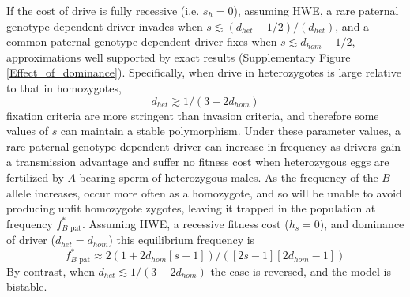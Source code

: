 \documentclass[12pt,letterpaper]{article}
\begin{document}
If the cost of drive is fully recessive (i.e. $s_h=0$), assuming HWE, 
	a rare paternal genotype dependent driver invades when 
	$s\lesssim (d_{het}-1/2)/(d_{het})$, and a common paternal genotype dependent driver fixes when 
	$s\lesssim d_{hom}-1/2$, approximations well supported by exact results (Supplementary Figure \ref{Effect_of_dominance}).
Specifically, when drive in heterozygotes is large relative to that in homozygotes, 
	\begin{equation} d_{het} \gtrsim 1/(3-2d_{hom}) \label{polymale} \end{equation}
	fixation criteria are more stringent than invasion criteria, 
	and therefore some values of $s$ can maintain a stable polymorphism. 
Under these parameter values, a rare paternal genotype dependent driver 
	can increase in frequency as drivers gain a transmission advantage and suffer 
	no fitness cost when heterozygous eggs are fertilized by 
	$A$-bearing sperm of heterozygous males. 
As the frequency of the $B$ allele increases, 
	occur more often as a homozygote, and so will be unable to 
	avoid producing unfit homozygote zygotes, leaving it trapped in
	the population at frequency $f_{B\text{ pat}}^*$. 
Assuming HWE, a recessive fitness cost ($h_s=0$), and dominance of driver ($d_{het}=d_{hom}$) this equilibrium frequency is
\begin{equation}f_{B\text{ pat}}^*\approx2 (1 + 2d_{hom}[s - 1])/([2 s - 1][2d_{hom}- 1]) \label{eqmale} \end{equation}
By contrast, when $d_{het} \lesssim 1/(3-2d_{hom})$ the case is reversed, and the model is bistable.
\end{document}
